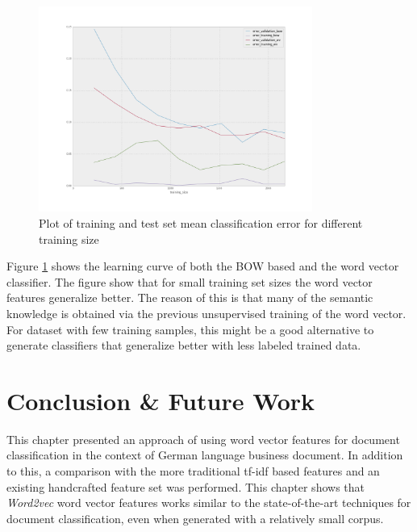 \begin{figure}[ht!]
	\begin{center}

			\includegraphics[width=0.8\textwidth]{images/plot-models.png} 

	\end{center}
	\caption{Plot of training and test set mean classification  error
          for different training size}
	\label{fig:w2v4tc_learning_curve}
\end{figure}

Figure \ref{fig:w2v4tc_learning_curve} shows the learning curve of both the
\ac{BOW} based and the word vector classifier. The figure show that for small
training set sizes the word vector features generalize better. The reason of
this is that many of the semantic knowledge is obtained via the previous unsupervised
training of the word vector. For dataset with few training samples, this
might be a good alternative to generate classifiers that generalize better
with less labeled trained data.


 

\section{Conclusion \& Future Work}
\label{sec:w2v4tc_conclusion}

This chapter presented an approach  of using  word vector features for
document classification in the context of German language business document.
In addition to this,  a comparison with the more
traditional \ac{tf-idf}  based features and an existing handcrafted
feature set was performed. This chapter shows that \textit{Word2vec} word
vector features works similar to the state-of-the-art techniques for document
classification, even when generated  with a relatively small corpus.

